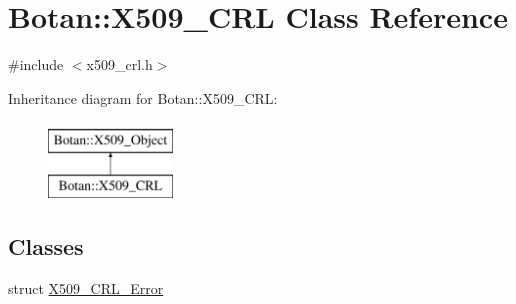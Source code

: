 \hypertarget{classBotan_1_1X509__CRL}{\section{Botan\-:\-:X509\-\_\-\-C\-R\-L Class Reference}
\label{classBotan_1_1X509__CRL}
}


{\ttfamily \#include $<$x509\-\_\-crl.\-h$>$}

Inheritance diagram for Botan\-:\-:X509\-\_\-\-C\-R\-L\-:\begin{figure}[H]
\begin{center}
\leavevmode
\includegraphics[height=2.000000cm]{classBotan_1_1X509__CRL}
\end{center}
\end{figure}
\subsection*{Classes}
\begin{DoxyCompactItemize}
\item 
struct \hyperlink{structBotan_1_1X509__CRL_1_1X509__CRL__Error}{X509\-\_\-\-C\-R\-L\-\_\-\-Error}
\end{DoxyCompactItemize}
